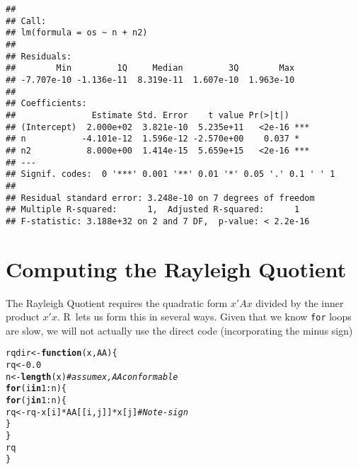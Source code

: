 \documentclass[10pt]{article}\usepackage[]{graphicx}\usepackage[]{color}
\makeatletter
\newcommand{\hlnum}[1]{\textcolor[rgb]{0.686,0.059,0.569}{#1}}%
\newcommand{\hlcom}[1]{\textcolor[rgb]{0.678,0.584,0.686}{\textit{#1}}}%
\newcommand{\hlopt}[1]{\textcolor[rgb]{0,0,0}{#1}}%
\newcommand{\hlstd}[1]{\textcolor[rgb]{0.345,0.345,0.345}{#1}}%
\newcommand{\hlkwa}[1]{\textcolor[rgb]{0.161,0.373,0.58}{\textbf{#1}}}%
\newcommand{\hlkwb}[1]{\textcolor[rgb]{0.69,0.353,0.396}{#1}}%
\newcommand{\hlkwc}[1]{\textcolor[rgb]{0.333,0.667,0.333}{#1}}%
\newcommand{\hlkwd}[1]{\textcolor[rgb]{0.737,0.353,0.396}{\textbf{#1}}}%
\newenvironment{kframe}{%
 \def\at@end@of@kframe{}%
 \ifinner\ifhmode%
  \def\at@end@of@kframe{\end{minipage}}%
  \begin{minipage}{\columnwidth}%
 \fi\fi%
 \def\FrameCommand##1{\hskip\@totalleftmargin \hskip-\fboxsep
 \colorbox{shadecolor}{##1}\hskip-\fboxsep
     \hskip-\linewidth \hskip-\@totalleftmargin \hskip\columnwidth}%
 \MakeFramed {\advance\hsize-\width
   \@totalleftmargin\z@ \linewidth\hsize
   \@setminipage}}%
 {\par\unskip\endMakeFramed%
 \at@end@of@kframe}
\newenvironment{knitrout}{}{} %
\newcommand{\R}{{\sf R\ }}
\newcommand{\code}[1]{{\tt #1}}
\makeatother
\begin{document}
\begin{knitrout}
\begin{kframe}
{\ttfamily\noindent\color{warningcolor}{\#\# Warning in summary.lm(osize): essentially perfect fit: summary may be unreliable}}\begin{verbatim}
## 
## Call:
## lm(formula = os ~ n + n2)
## 
## Residuals:
##        Min         1Q     Median         3Q        Max 
## -7.707e-10 -1.136e-11  8.319e-11  1.607e-10  1.963e-10 
## 
## Coefficients:
##               Estimate Std. Error    t value Pr(>|t|)    
## (Intercept)  2.000e+02  3.821e-10  5.235e+11   <2e-16 ***
## n           -4.101e-12  1.596e-12 -2.570e+00    0.037 *  
## n2           8.000e+00  1.414e-15  5.659e+15   <2e-16 ***
## ---
## Signif. codes:  0 '***' 0.001 '**' 0.01 '*' 0.05 '.' 0.1 ' ' 1
## 
## Residual standard error: 3.248e-10 on 7 degrees of freedom
## Multiple R-squared:      1,	Adjusted R-squared:      1 
## F-statistic: 3.188e+32 on 2 and 7 DF,  p-value: < 2.2e-16
\end{verbatim}
\end{kframe}
\end{knitrout}


\section{Computing the Rayleigh Quotient}

\label{sect:crq}

The Rayleigh Quotient requires the quadratic form $ x' A x$ divided
by the inner product $x' x$. \R lets us form this in several ways. 
Given that we know \code{for} loops are slow, we will not actually
use the direct code (incorporating the minus sign)

\begin{knitrout}\scriptsize
{}\color{fgcolor}\begin{kframe}
\begin{alltt}
\hlstd{rqdir}\hlkwb{<-}\hlkwa{function}\hlstd{(}\hlkwc{x}\hlstd{,} \hlkwc{AA}\hlstd{)\{}
  \hlstd{rq}\hlkwb{<-}\hlnum{0.0}
  \hlstd{n}\hlkwb{<-}\hlkwd{length}\hlstd{(x)} \hlcom{# assume x, AA conformable}
  \hlkwa{for} \hlstd{(i} \hlkwa{in} \hlnum{1}\hlopt{:}\hlstd{n) \{}
     \hlkwa{for} \hlstd{(j} \hlkwa{in} \hlnum{1}\hlopt{:}\hlstd{n) \{}
        \hlstd{rq}\hlkwb{<-}\hlstd{rq}\hlopt{-}\hlstd{x[i]}\hlopt{*}\hlstd{AA[[i,j]]}\hlopt{*}\hlstd{x[j]} \hlcom{# Note - sign}
     \hlstd{\}}
  \hlstd{\}}
  \hlstd{rq}
\hlstd{\}}
\end{alltt}
\end{kframe}
\end{knitrout}
\end{document}
